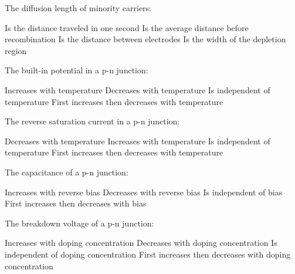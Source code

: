 \begin{question}[2]
The diffusion length of minority carriers:

\begin{oneparcheckboxes}
\choice Is the distance traveled in one second
\correctchoice Is the average distance before recombination
\choice Is the distance between electrodes
\choice Is the width of the depletion region
\end{oneparcheckboxes}
\end{question}

\begin{question}[2]
The built-in potential in a p-n junction:

\begin{oneparcheckboxes}
\choice Increases with temperature
\correctchoice Decreases with temperature
\choice Is independent of temperature
\choice First increases then decreases with temperature
\end{oneparcheckboxes}
\end{question}

\begin{question}[2]
The reverse saturation current in a p-n junction:

\begin{oneparcheckboxes}
\choice Decreases with temperature
\correctchoice Increases with temperature
\choice Is independent of temperature
\choice First increases then decreases with temperature
\end{oneparcheckboxes}
\end{question}

\begin{question}[2]
The capacitance of a p-n junction:

\begin{oneparcheckboxes}
\choice Increases with reverse bias
\correctchoice Decreases with reverse bias
\choice Is independent of bias
\choice First increases then decreases with bias
\end{oneparcheckboxes}
\end{question}

\begin{question}[2]
The breakdown voltage of a p-n junction:

\begin{oneparcheckboxes}
\choice Increases with doping concentration
\correctchoice Decreases with doping concentration
\choice Is independent of doping concentration
\choice First increases then decreases with doping concentration
\end{oneparcheckboxes}
\end{question}


